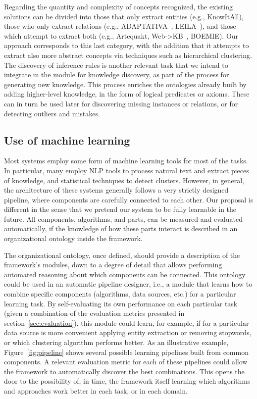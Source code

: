 Regarding the quantity and complexity of concepts recognized, the existing solutions can
be divided into those that only extract entities (e.g., KnowItAll), those who only extract
relations (e.g., ADAPTATIVA~\cite{adaptativa}, LEILA~\cite{leila}), and those which attempt to extract both (e.g., Artequakt, Web->KB~\cite{webkb}, BOEMIE).
Our approach corresponds to this last category, with the addition that it attempts to extract also
more abstract concepts via techniques such as hierarchical clustering.
The discovery of inference rules is another relevant task that we intend to integrate
in the module for knowledge discovery, as part of the process for generating new knowledge.
This process enriches the ontologies already built by adding higher-level knowledge, in the form
of logical predicates or axioms. These can in turn be used later for discovering missing instances
or relations, or for detecting outliers and mistakes.

\subsection{Use of machine learning}

Most systems employ some form of machine learning tools for most of the
tasks. In particular, many employ NLP tools to process natural text and extract pieces of knowledge,
and statistical techniques to detect clusters. However, in general, the architecture of these
systems generally follows a very strictly designed pipeline, where components are carefully
connected to each other. Our proposal is different in the sense that we pretend our system
to be fully learnable in the future. All components, algorithms, and parts, can be measured and evaluated
automatically, if the knowledge of how these parts interact is described in an organizational
ontology inside the framework.

The organizational ontology, once defined, should provide a description of the framework's
modules, down to a degree of detail that allows performing automated reasoning about which
components can be connected. This ontology could be used in an automatic pipeline
designer, i.e., a module that learns how to combine specific components
(algorithms, data sources, etc.) for a particular learning task. By self-evaluating
its own performance on each particular task (given a combination of the evaluation
metrics presented in section~\ref{sec:evaluation}), this module could learn, for example,
if for a particular data source is more convenient applying entity extraction or removing
stopwords, or which clustering algorithm performs better.
As an illustrative example, Figure~\ref{fig:pipeline} shows several possible
learning pipelines built from common components. A relevant evaluation metric for each
of these pipelines could allow the framework to automatically discover the best combinations.
This opens the door to the possibility of, in time, the framework
itself learning which algorithms and approaches work better in each task, or in each domain.

